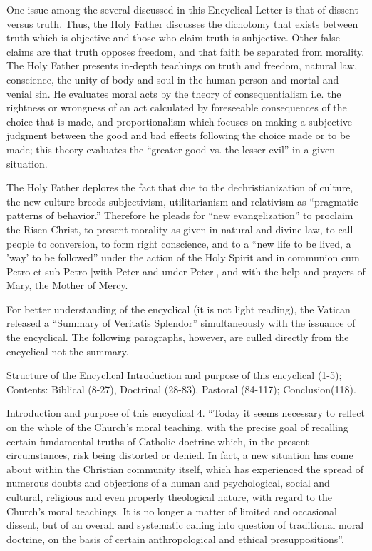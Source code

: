 \documentclass[oneside]{book}
\begin{document}
One issue among the several discussed in this Encyclical Letter is that of
dissent versus truth. Thus, the Holy Father discusses the dichotomy that exists
between truth which is objective and those who claim truth is subjective. Other
false claims are that truth opposes freedom, and that faith be separated from
morality. The Holy Father presents in-depth teachings on truth and freedom,
natural law, conscience, the unity of body and soul in the human person and
mortal and venial sin. He evaluates moral acts by the theory of consequentialism
i.e. the rightness or wrongness of an act calculated by foreseeable consequences
of the choice that is made, and proportionalism which focuses on making a
subjective judgment between the good and bad effects following the choice made
or to be made; this theory evaluates the ``greater good vs. the lesser evil'' in
a given situation.

The Holy Father deplores the fact that due to the dechristianization of culture,
the new culture breeds subjectivism, utilitarianism and relativism as
``pragmatic patterns of behavior.'' Therefore he pleads for ``new
evangelization'' to proclaim the Risen Christ, to present morality as given in
natural and divine law, to call people to conversion, to form right conscience,
and to a ``new life to be lived, a 'way' to be followed'' under the action of
the Holy Spirit and in communion cum Petro et sub Petro [with Peter and under
Peter], and with the help and prayers of Mary, the Mother of Mercy.

For better understanding of the encyclical (it is not light reading), the
Vatican released a ``Summary of Veritatis Splendor'' simultaneously with the
issuance of the encyclical. The following paragraphs, however, are culled
directly from the encyclical not the summary.

Structure of the Encyclical
Introduction and purpose of this encyclical (1-5); Contents: Biblical (8-27),
Doctrinal (28-83), Pastoral (84-117); Conclusion(118).

Introduction and purpose of this encyclical
4. ``Today it seems necessary to reflect on the whole of the Church's moral
teaching, with the precise goal of recalling certain fundamental truths of
Catholic doctrine which, in the present circumstances, risk being distorted or
denied. In fact, a new situation has come about within the Christian community
itself, which has experienced the spread of numerous doubts and objections of a
human and psychological, social and cultural, religious and even properly
theological nature, with regard to the Church's moral teachings. It is no longer
a matter of limited and occasional dissent, but of an overall and systematic
calling into question of traditional moral doctrine, on the basis of certain
anthropological and ethical presuppositions''.
\end{document}
